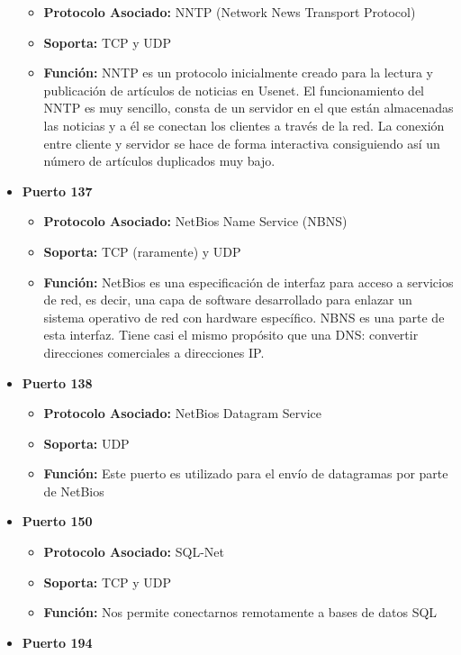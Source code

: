 \documentclass[a4paper,12pt]{article}
\begin{document}
\begin{itemize}
 \begin{itemize}
  \item \textbf{Protocolo Asociado:} NNTP (Network News Transport Protocol)
  \item \textbf{Soporta:} TCP y UDP
  \item \textbf{Función:}  NNTP  es un protocolo inicialmente creado para la lectura y publicación de artículos de noticias en Usenet. El funcionamiento del NNTP es muy
  sencillo, consta de un servidor en el que están almacenadas las noticias y a él se conectan los clientes a través de la red.
  La conexión entre cliente y servidor se hace de forma interactiva consiguiendo así un número de artículos duplicados muy bajo.
 \end{itemize}
 \item \textbf{Puerto 137}
 \begin{itemize}
  \item \textbf{Protocolo Asociado:} NetBios Name Service (NBNS)
  \item \textbf{Soporta:} TCP (raramente) y UDP
  \item \textbf{Función:} NetBios es una especificación de interfaz para acceso a servicios de red, es decir, una capa de software desarrollado para enlazar un sistema operativo
  de red con hardware específico. NBNS es una parte de esta interfaz. Tiene casi el mismo propósito que una DNS: convertir direcciones comerciales a direcciones IP.
 \end{itemize}
 \item \textbf{Puerto 138}
 \begin{itemize}
  \item \textbf{Protocolo Asociado:} NetBios Datagram Service 
  \item \textbf{Soporta:} UDP
  \item \textbf{Función:} Este puerto es utilizado para el envío de datagramas por parte de NetBios
 \end{itemize}
 \item \textbf{Puerto 150}
 \begin{itemize}
  \item \textbf{Protocolo Asociado:} SQL-Net
  \item \textbf{Soporta:} TCP y UDP
  \item \textbf{Función:} Nos permite conectarnos remotamente a bases de datos SQL
 \end{itemize}
 \item \textbf{Puerto 194}
 \begin{itemize}

\end{itemize}
\end{itemize}
\end{document}
